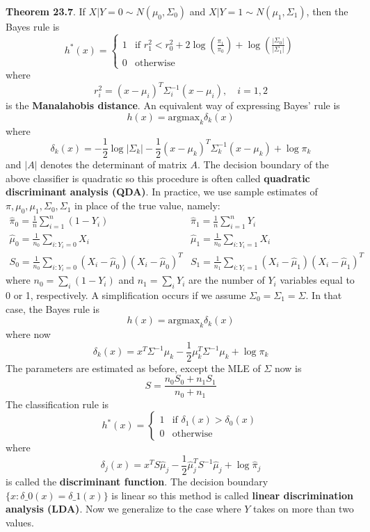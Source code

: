 \textbf{Theorem 23.7}. If \(X | Y = 0 \sim N(\mu_{0}, \Sigma_{0})\) and
\(X | Y = 1 \sim N(\mu_{1}, \Sigma_{1})\), then the Bayes rule is
\[
h^{*}(x) = \begin{cases}
1 & \text{if } r_{1}^{2} < r_{0}^{2} + 2 \log \left( \frac{\pi_{1}}{\pi_{0}} \right) + \log \left( \frac{| \Sigma_{0} | }{ | \Sigma_{1}| }
\right) \\
0 & \text{otherwise} 
\end{cases}
\]
where
\[
r_{i}^{2} = (x - \mu_{i})^T \Sigma_{i}^{-1}(x - \mu_{i}), \quad i = 1, 2
\]
is the \textbf{Manalahobis distance}. An equivalent way of expressing
Bayes' rule is
\[
h(x) = \text{argmax}_{k} \delta_{k}(x)
\]
where
\[
\delta_{k}(x) = -\frac{1}{2} \log | \Sigma_{k} | - \frac{1}{2} (x - \mu_{k})^T \Sigma_{k}^{-1} (x - \mu_{k}) + \log \pi_{k}
\]
and \(|A|\) denotes the determinant of matrix \(A\).
The decision boundary of the above classifier is quadratic so this
procedure is often called \textbf{quadratic discriminant analysis
(QDA)}. In practice, we use sample estimates of
\(\pi, \mu_{0}, \mu_{1}, \Sigma_{0}, \Sigma_{1}\) in place of the true value,
namely:
\[
\begin{array}{cc}
\hat{\pi}_{0} = \frac{1}{n} \sum_{i=1}^{n} (1 - Y_{i}) & \hat{\pi}_{1} = \frac{1}{n} \sum_{i=1}^{n} Y_{i} \\
\hat{\mu}_{0} = \frac{1}{n_{0}} \sum_{i: Y_{i} = 0} X_{i} & \hat{\mu}_{1} = \frac{1}{n_{0}} \sum_{i: Y_{i} = 1} X_{i} \\
S_{0} = \frac{1}{n_{0}} \sum_{i: Y_{i} = 0} (X_{i} - \hat{\mu}_{0}) (X_{i} - \hat{\mu}_{0})^T & 
S_{1} = \frac{1}{n_{1}} \sum_{i: Y_{i} = 1} (X_{i} - \hat{\mu}_{1}) (X_{i} - \hat{\mu}_{1})^T
\end{array}
\]
where \(n_{0} = \sum_{i} (1 - Y_{i})\) and \(n_{1} = \sum_{i} Y_{i}\) are the number
of \(Y_{i}\) variables equal to 0 or 1, respectively.
A simplification occurs if we assume \(\Sigma_{0} = \Sigma_{1} = \Sigma\).
In that case, the Bayes rule is
\[
h(x) = \text{argmax}_{k} \delta_{k}(x)
\]
where now
\[
\delta_{k}(x) = x^T \Sigma^{-1} \mu_{k} - \frac{1}{2} \mu_{k}^T \Sigma^{-1} \mu_{k} + \log \pi_{k}
\]
The parameters are estimated as before, except the MLE of \(\Sigma\) now
is
\[
S = \frac{n_{0} S_{0} + n_{1} S_{1}}{n_{0} + n_{1}}
\]
The classification rule is
\[
h^{*}(x) = \begin{cases}
1 &\text{if } \delta_{1}(x) > \delta_{0}(x) \\
0 &\text{otherwise}
\end{cases}
\]
where
\[
\delta_{j}(x) = x^T S \hat{\mu}_{j} - \frac{1}{2} \hat{\mu}_{j}^T S^{-1} \hat{\mu}_{j} + \log \hat{\pi}_{j}
\]
is called the \textbf{discriminant function}. The decision boundary $
\{ x : \delta\_{0}(x) = \delta\_{1}(x) \}$ is linear so this method is
called \textbf{linear discrimination analysis (LDA)}.
Now we generalize to the case where \(Y\) takes on more than two values.

